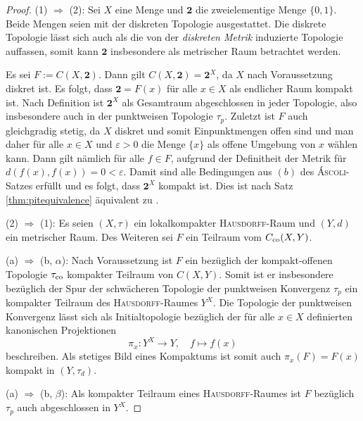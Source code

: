 \begin{proof}
  (1) $\Rightarrow$ (2): Sei $X$ eine Menge und $\mathbf{2}$ die zweielementige Menge $\{0,1\}$. Beide Mengen seien  mit der diskreten Topologie ausgestattet. 
  Die diskrete Topologie lässt sich auch als die von der \textit{diskreten Metrik} induzierte Topologie auffassen, somit kann $\mathbf{2}$ insbesondere als metrischer Raum betrachtet werden. 

  Es sei $F := C(X, \mathbf{2})$.
  Dann gilt $C(X, \mathbf{2}) = \mathbf{2}^X$, da $X$ nach Voraussetzung diskret ist.
  Es folgt, dass $\mathbf{2} = F(x)$ für alle $x \in X$ als endlicher Raum kompakt ist.
  Nach Definition ist $\mathbf{2}^X$ als Gesamtraum abgeschlossen in jeder Topologie, also insbesondere auch in der punktweisen Topologie $\tau_p$.
  Zuletzt ist $F$ auch gleichgradig stetig, da $X$ diskret und somit Einpunktmengen offen sind und man daher für alle $x \in X$ und $\varepsilon > 0$ die Menge $\{x\}$ als offene Umgebung von $x$ wählen kann.
  Dann gilt nämlich für alle $f \in F$, aufgrund der Definitheit der Metrik für  $d(f(x),f(x)) = 0 < \varepsilon$.
  Damit sind alle Bedingungen aus $(b)$ des \textsc{Áscoli}-Satzes erfüllt und es folgt, dass $\mathbf{2}^X$ kompakt ist. 
  Dies ist nach Satz \ref{thm:pitequivalence} äquivalent zu \PIT.

  (2) $\Rightarrow$ (1): Es seien $(X,\tau)$ ein lokalkompakter \textsc{Hausdorff}-Raum und $(Y,d)$ ein metrischer Raum.
  Des Weiteren sei $F$ ein Teilraum vom $C_{\mathrm{co}}(X,Y)$.

  (a) $\Rightarrow$ (b, $\alpha$): 
  Nach Voraussetzung ist $F$ ein bezüglich der kompakt-offenen Topologie $\tau_{\mathrm{co}}$ kompakter Teilraum von $C(X,Y)$.
  Somit ist er insbesondere bezüglich der Spur der schwächeren Topologie der punktweisen Konvergenz $\tau_p$ ein kompakter Teilraum des \textsc{Hausdorff}-Raumes $Y^X$.
  Die Topologie der punktweisen Konvergenz lässt sich als Initialtopologie bezüglich der für alle $x \in X$ definierten kanonischen Projektionen 
  \begin{displaymath}
    \pi_x : Y^X \to Y, \quad f \mapsto f(x)
  \end{displaymath}
  beschreiben.
  Als stetiges Bild eines Kompaktums ist somit auch $\pi_x(F) = F(x)$ kompakt in $(Y,\tau_d)$.

  (a) $\Rightarrow$ (b, $\beta$):  
  Als kompakter Teilraum eines \textsc{Hausdorff}-Raumes ist $F$ bezüglich $\tau_p$ auch abgeschlossen in $Y^X$.


\end{proof}
